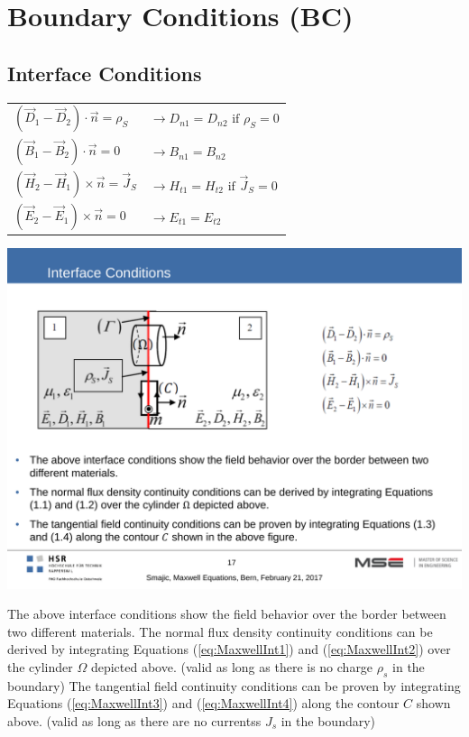 \section{Boundary Conditions (BC)}
\subsection{Interface Conditions}
\begin{minipage}[rt]{8cm}
	\begin{tabular}{ll}
		\(\displaystyle \left(\vec{D}_1 - \vec{D}_2\right) \cdot \vec{n} = \rho_S\) & \(\displaystyle \rightarrow D_{n1} = D_{n2} \textrm{ if } \rho_S = 0\)\\
		\(\displaystyle\left(\vec{B}_1 - \vec{B}_2\right) \cdot \vec{n} = 0 \) & \(\displaystyle \rightarrow B_{n1} = B_{n2}\)\\
		\(\displaystyle\left(\vec{H}_2 - \vec{H}_1\right) \times \vec{n} =\vec{J}_S \) & \(\displaystyle \rightarrow H_{t1} = H_{t2} \textrm{ if } \vec{J}_S = 0\) \\
		\(\displaystyle\left(\vec{E}_2 - \vec{E}_1\right) \times \vec{n} = 0 \) & \(\displaystyle \rightarrow E_{t1} = E_{t2} \)\\
	\end{tabular}
\end{minipage}
\begin{minipage}[lt]{11cm}
	\includegraphics[width=.6\textwidth]{./images/InterfaceConditions.pdf}\\
\end{minipage}
The above interface conditions show the field behavior over the border between two different materials. \newline
The normal flux density continuity conditions can be derived by integrating Equations (\ref{eq:MaxwellInt1}) and (\ref{eq:MaxwellInt2}) over the cylinder $\Omega$ depicted above. (valid as long as there is no charge $\rho_s$ in the boundary) \newline
The tangential field continuity conditions can be proven by integrating Equations (\ref{eq:MaxwellInt3}) and (\ref{eq:MaxwellInt4}) along the contour $C$ shown above. (valid as long as there are no currentss $J_s$ in the boundary)